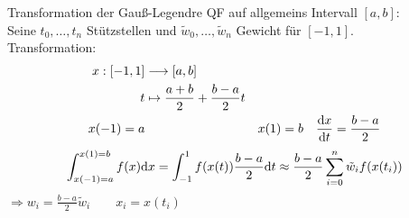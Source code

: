 Transformation der Gauß-Legendre QF auf allgemeins Intervall $[a,b]$:\\
Seine $t_0,\ldots,t_n$ Stützstellen und $\tilde{w}_0,\ldots,\tilde{w}_n$ Gewicht für $[-1,1]$.\\
Transformation: 
\begin{align*}
  x:[-1,1] &\longrightarrow [a,b]\\
  t &\mapsto \frac{a+b}{2} + \frac{b-a}{2} t\\
  x(-1) = a && x(1) = b && \frac{\mathrm{d}x}{\mathrm{d}t} = \frac{b-a}{2} 
\end{align*}
\begin{align*}
  \int_{x(-1)=a}^{x(1)=b} f(x) \mathrm{d}x = \int_{-1}^1 f(x(t)) \frac{b-a}{2} \mathrm{d}t \approx
    \frac{b-a}{2} \sum\limits_{i=0}^{n}{\tilde{w}_i f(x(t_i))}
\end{align*}
$\Rightarrow w_i = \frac{b-a}{2} \tilde{w}_i \qquad x_i = x(t_i)$
